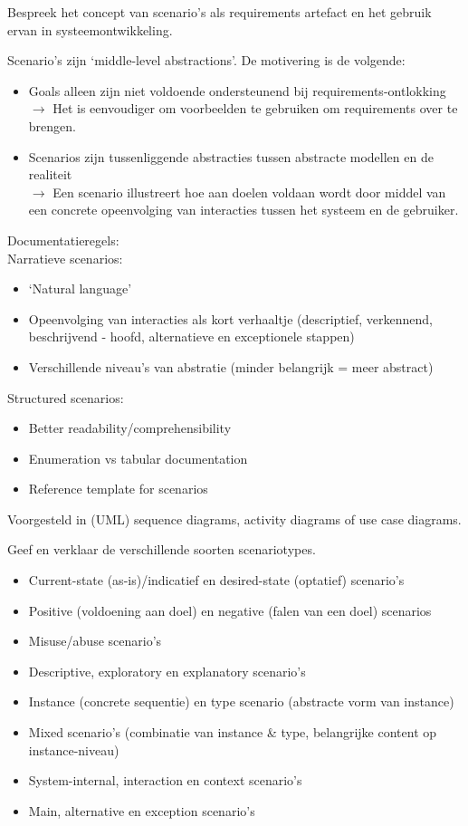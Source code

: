\documentclass{article}
\begin{document}
\begin{quest}{}Bespreek het concept van scenario's als requirements artefact en het gebruik ervan in systeemontwikkeling.
\end{quest}
Scenario's zijn `middle-level abstractions'. De motivering is de volgende:
\begin{itemize}
	\item Goals alleen zijn niet voldoende ondersteunend bij requirements-ontlokking\\
    $\rightarrow$ Het is eenvoudiger om voorbeelden te gebruiken om requirements over te brengen.
    \item Scenarios zijn tussenliggende abstracties tussen abstracte modellen en de realiteit\\
    $\rightarrow$ Een scenario illustreert hoe aan doelen voldaan wordt door middel van een concrete opeenvolging van interacties tussen het systeem en de gebruiker.
\end{itemize}
Documentatieregels:\\
Narratieve scenarios:
\begin{itemize}
    \item `Natural language'
    \item Opeenvolging van interacties als kort verhaaltje (descriptief, verkennend, beschrijvend - hoofd, alternatieve en exceptionele stappen)
    \item Verschillende niveau's van abstratie (minder belangrijk = meer abstract)
\end{itemize}
Structured scenarios:
\begin{itemize}
    \item Better readability/comprehensibility
    \item Enumeration vs tabular documentation
    \item Reference template for scenarios\\
\end{itemize}
Voorgesteld in (UML) sequence diagrams, activity diagrams of use case diagrams.

\begin{quest}{}Geef en verklaar de verschillende soorten scenariotypes.\end{quest}
\begin{itemize}
    \item Current-state (as-is)/indicatief en desired-state (optatief) scenario's
    \item Positive (voldoening aan doel) en negative (falen van een doel) scenarios
    \item Misuse/abuse scenario's
    \item Descriptive, exploratory en explanatory scenario's
    \item Instance (concrete sequentie) en type scenario (abstracte vorm van instance)
    \item Mixed scenario's (combinatie van instance \& type, belangrijke content op instance-niveau)
    \item System-internal, interaction en context scenario's
    \item Main, alternative en exception scenario's
\end{itemize}
\end{document}
